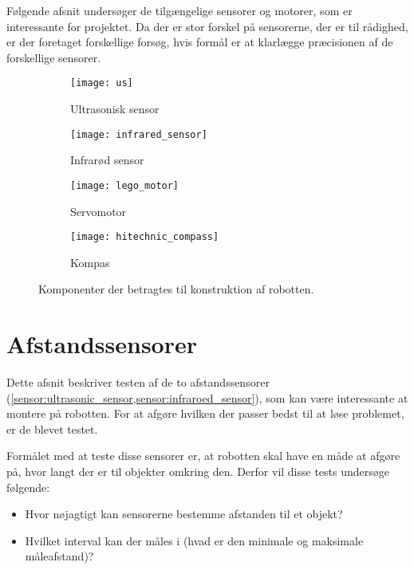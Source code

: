 \label{sensorer}
Følgende afsnit undersøger de tilgængelige sensorer og motorer, som er interessante for projektet.
Da der er stor forskel på sensorerne, der er til rådighed, er der foretaget forskellige forsøg, hvis formål er at klarlægge præcisionen af de forskellige sensorer.

\begin{figure}[h]
\centering
\begin{subfigure}[b]{.4\textwidth}
\centering
\texttt{[image: us]}
\caption{Ultrasonisk sensor}
\label{sensor:ultrasonic_sensor}
\end{subfigure}
\begin{subfigure}[b]{.4\textwidth}
\centering
\texttt{[image: infrared\_sensor]}
\caption{Infrarød sensor}
\label{sensor:infraroed_sensor}
\end{subfigure}
\begin{subfigure}[b]{.4\textwidth}
\centering
\texttt{[image: lego\_motor]}
\caption{Servomotor}
\label{sensor:servo_motor}
\end{subfigure}
\begin{subfigure}[b]{.4\textwidth}
\centering
\texttt{[image: hitechnic\_compass]}
\caption{Kompas}
\label{sensor:compass}
\end{subfigure}
\caption{Komponenter der betragtes til konstruktion af robotten.}
\end{figure}

\section{Afstandssensorer}
Dette afsnit beskriver testen af de to afstandssensorer (\cref{sensor:ultrasonic_sensor,sensor:infraroed_sensor}), som kan være interessante at montere på robotten.
For at afgøre hvilken der passer bedst til at løse problemet, er de blevet testet.

Formålet med at teste disse sensorer er, at robotten skal have en måde at afgøre på, hvor langt der er til objekter omkring den.
Derfor vil disse tests undersøge følgende:
\begin{itemize}
\item Hvor nøjagtigt kan sensorerne bestemme afstanden til et objekt?
\item Hvilket interval kan der måles i (hvad er den minimale og maksimale måleafstand)?
\end{itemize}

